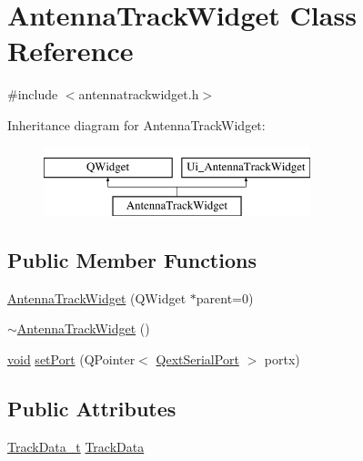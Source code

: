 \hypertarget{class_antenna_track_widget}{\section{Antenna\-Track\-Widget Class Reference}
\label{class_antenna_track_widget}
}


{\ttfamily \#include $<$antennatrackwidget.\-h$>$}

Inheritance diagram for Antenna\-Track\-Widget\-:\begin{figure}[H]
\begin{center}
\leavevmode
\includegraphics[height=2.000000cm]{class_antenna_track_widget}
\end{center}
\end{figure}
\subsection*{Public Member Functions}
\begin{DoxyCompactItemize}
\item 
\hyperlink{group___antenna_track_gadget_plugin_ga267d3ecf78fda6b906d043097dd0aa45}{Antenna\-Track\-Widget} (Q\-Widget $\ast$parent=0)
\item 
\hyperlink{group___antenna_track_gadget_plugin_gaee8823dccf11047cf563237c1f8e4864}{$\sim$\-Antenna\-Track\-Widget} ()
\item 
\hyperlink{group___u_a_v_objects_plugin_ga444cf2ff3f0ecbe028adce838d373f5c}{void} \hyperlink{group___antenna_track_gadget_plugin_gafe776706c20e81410397bf737b254c56}{set\-Port} (Q\-Pointer$<$ \hyperlink{class_qext_serial_port}{Qext\-Serial\-Port} $>$ portx)
\end{DoxyCompactItemize}
\subsection*{Public Attributes}
\begin{DoxyCompactItemize}
\item 
\hyperlink{group___antenna_track_gadget_plugin_ga2a189738d52fd5df21e4a823d19ad1ac}{Track\-Data\-\_\-t} \hyperlink{group___antenna_track_gadget_plugin_ga18b3b7f2868671ca1d6e117f0bbccd90}{Track\-Data}
\end{DoxyCompactItemize}


